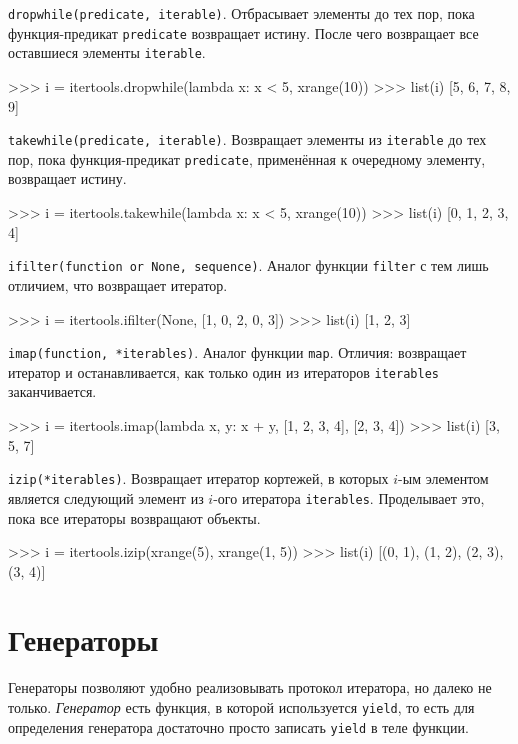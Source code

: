 \lstinline{dropwhile(predicate, iterable)}. Отбрасывает элементы до тех пор, пока функция-предикат \lstinline{predicate} возвращает истину. После чего возвращает все оставшиеся элементы \lstinline{iterable}.
\begin{pylst}{}{}
>>> i = itertools.dropwhile(lambda x: x < 5, xrange(10))
>>> list(i)
[5, 6, 7, 8, 9]
\end{pylst}

\lstinline{takewhile(predicate, iterable)}. Возвращает элементы из \lstinline{iterable} до тех пор, пока функция-предикат \lstinline{predicate}, применённая к очередному элементу, возвращает истину.
\begin{pylst}{}{}
>>> i = itertools.takewhile(lambda x: x < 5, xrange(10))
>>> list(i)
[0, 1, 2, 3, 4]
\end{pylst}

\lstinline{ifilter(function or None, sequence)}. Аналог функции \lstinline{filter} с тем лишь отличием, что возвращает итератор.
\begin{pylst}{}{}
>>> i = itertools.ifilter(None, [1, 0, 2, 0, 3])
>>> list(i)
[1, 2, 3]
\end{pylst}

\lstinline{imap(function, *iterables)}. Аналог функции \lstinline{map}. Отличия: возвращает итератор и останавливается, как только один из итераторов \lstinline{iterables} заканчивается.
\begin{pylst}{}{}
>>> i = itertools.imap(lambda x, y: x + y, [1, 2, 3, 4], [2, 3, 4])
>>> list(i)
[3, 5, 7]
\end{pylst}

\lstinline{izip(*iterables)}. Возвращает итератор кортежей, в которых $i$-ым элементом является следующий элемент из $i$-ого итератора \lstinline{iterables}. Проделывает это, пока все итераторы возвращают объекты.
\begin{pylst}{}{}
>>> i = itertools.izip(xrange(5), xrange(1, 5))
>>> list(i)
[(0, 1), (1, 2), (2, 3), (3, 4)]
\end{pylst}

\section{Генераторы}
\label{sec:py-generators}
Генераторы позволяют удобно реализовывать протокол итератора, но далеко не только. \emph{Генератор} есть функция, в которой используется \lstinline{yield}, то есть для определения генератора достаточно просто записать \lstinline{yield} в теле функции.

